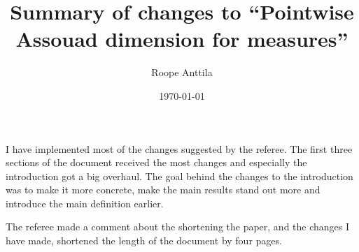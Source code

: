 \documentclass[12pt]{amsart}
\numberwithin{equation}{section}
\theoremstyle{plain}
\theoremstyle{definition}
\theoremstyle{remark}
\begin{document}
\title{Summary of changes to ``Pointwise Assouad dimension for measures''}
\author{Roope Anttila}

\date{\today}

\maketitle

I have implemented most of the changes suggested by the referee. The first three sections of the document received the most changes and especially the introduction got a big overhaul. The goal behind the changes to the introduction was to make it more concrete, make the main results stand out more and introduce the main definition earlier.

The referee made a comment about the shortening the paper, and the changes I have made, shortened the length of the document by four pages.
\end{document}
